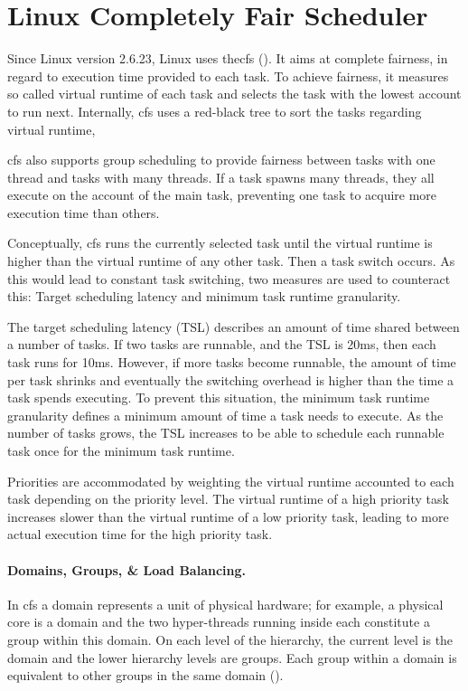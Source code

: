 \section{Linux Completely Fair Scheduler}
\label{state:cfs}


Since Linux version 2.6.23, Linux uses the\gls{cfs} (\cite{linux_cfs_doc}).
It aims at complete fairness, in regard to execution time provided to each task.
To achieve fairness, it measures so called virtual runtime of each task and
selects the task with the lowest account to run next.
Internally, \gls{cfs} uses a red-black tree to sort the tasks regarding virtual
runtime,

\gls{cfs} also supports group scheduling to provide fairness between tasks with one
thread and tasks with many threads.
If a task spawns many threads, they all execute on the account of the main
task, preventing one task to acquire more execution time than others.

Conceptually, \gls{cfs} runs the currently selected task until the virtual runtime is
higher than the virtual runtime of any other task.
Then a task switch occurs.
As this would lead to constant task switching, two measures are used to
counteract this: Target scheduling latency and minimum task runtime granularity.

The target scheduling latency (TSL) describes an amount of time shared between a
number of tasks.
If two tasks are runnable, and the TSL is 20ms, then each task runs for 10ms.
However, if more tasks become runnable, the amount of time per task shrinks and
eventually the switching overhead is higher than the time a task spends
executing.
To prevent this situation, the minimum task runtime granularity defines a
minimum amount of time a task needs to execute.
As the number of tasks grows, the TSL increases to be able to schedule each
runnable task once for the minimum task runtime.

Priorities are accommodated by weighting the virtual runtime accounted to each
task depending on the priority level.
The virtual runtime of a high priority task increases slower than the virtual
runtime of a low priority task, leading to more actual execution time for the
high priority task.

\paragraph{Domains, Groups, \& Load Balancing.}
In \gls{cfs} a domain represents a unit of physical hardware;
for example, a physical core is a domain and the two hyper-threads running
inside each constitute a group within this domain.
On each level of the hierarchy, the current level is the domain and the lower
hierarchy levels are groups.
Each group within a domain is equivalent to other groups in the same domain
(\cite{lwn_sched_domains}).


